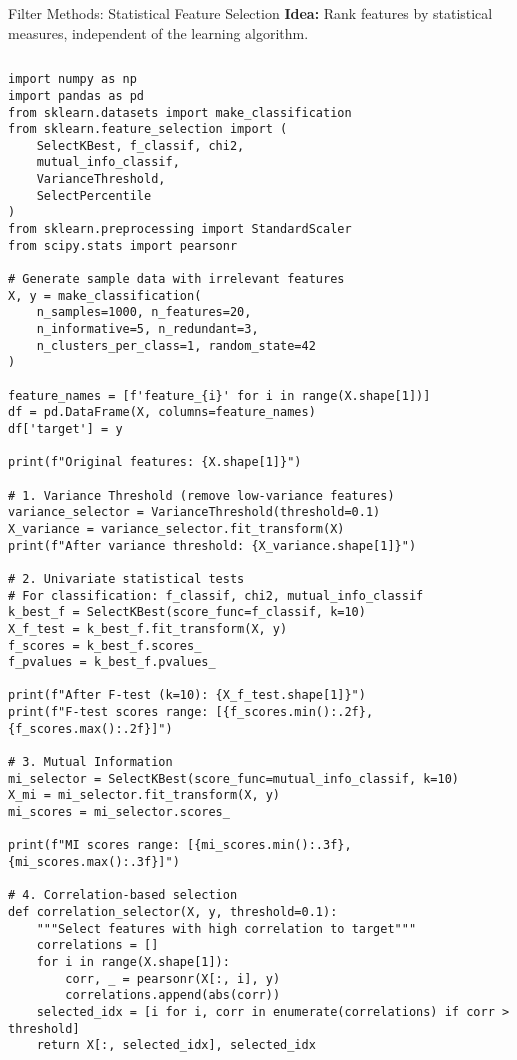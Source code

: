 \documentclass[aspectratio=169,11pt]{beamer}
\begin{document}
\begin{frame}[fragile]{Filter Methods: Statistical Feature Selection}
\textbf{Idea:} Rank features by statistical measures, independent of the learning algorithm.

\begin{columns}
\begin{column}{0.55\textwidth}
\begin{lstlisting}
import numpy as np
import pandas as pd
from sklearn.datasets import make_classification
from sklearn.feature_selection import (
    SelectKBest, f_classif, chi2, 
    mutual_info_classif,
    VarianceThreshold,
    SelectPercentile
)
from sklearn.preprocessing import StandardScaler
from scipy.stats import pearsonr

# Generate sample data with irrelevant features
X, y = make_classification(
    n_samples=1000, n_features=20, 
    n_informative=5, n_redundant=3,
    n_clusters_per_class=1, random_state=42
)

feature_names = [f'feature_{i}' for i in range(X.shape[1])]
df = pd.DataFrame(X, columns=feature_names)
df['target'] = y

print(f"Original features: {X.shape[1]}")

# 1. Variance Threshold (remove low-variance features)
variance_selector = VarianceThreshold(threshold=0.1)
X_variance = variance_selector.fit_transform(X)
print(f"After variance threshold: {X_variance.shape[1]}")

# 2. Univariate statistical tests
# For classification: f_classif, chi2, mutual_info_classif
k_best_f = SelectKBest(score_func=f_classif, k=10)
X_f_test = k_best_f.fit_transform(X, y)
f_scores = k_best_f.scores_
f_pvalues = k_best_f.pvalues_

print(f"After F-test (k=10): {X_f_test.shape[1]}")
print(f"F-test scores range: [{f_scores.min():.2f}, {f_scores.max():.2f}]")

# 3. Mutual Information
mi_selector = SelectKBest(score_func=mutual_info_classif, k=10)
X_mi = mi_selector.fit_transform(X, y)
mi_scores = mi_selector.scores_

print(f"MI scores range: [{mi_scores.min():.3f}, {mi_scores.max():.3f}]")

# 4. Correlation-based selection
def correlation_selector(X, y, threshold=0.1):
    """Select features with high correlation to target"""
    correlations = []
    for i in range(X.shape[1]):
        corr, _ = pearsonr(X[:, i], y)
        correlations.append(abs(corr))
    selected_idx = [i for i, corr in enumerate(correlations) if corr > threshold]
    return X[:, selected_idx], selected_idx


\end{lstlisting}
\end{column}
\end{columns}
\end{frame}
\end{document}
